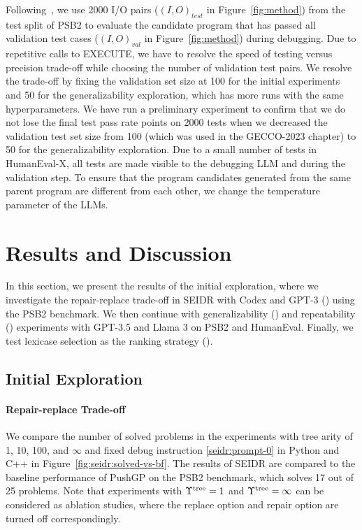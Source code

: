 Following~\cite{psb2}, we use 2000 I/O pairs ($\left(I, O\right)_{test}$ in Figure~\ref{fig:method}) from the test split of PSB2 to evaluate the candidate program that has passed all validation test cases ($\left(I, O\right)_{val}$ in Figure~\ref{fig:method}) during debugging. 
Due to repetitive calls to EXECUTE, we have to resolve the speed of testing versus precision trade-off while choosing the number of validation test pairs.
We resolve the trade-off by fixing the validation set size at 100 for the initial experiments and 50 for the generalizability exploration, which has more runs with the same hyperparameters. 
We have run a preliminary experiment to confirm that we do not lose the final test pass rate points on 2000 tests when we decreased the validation test set size from 100 (which was used in the GECCO-2023  chapter) to 50 for the generalizability exploration.
Due to a small number of tests in HumanEval-X, all tests are made visible to the debugging LLM and during the validation step.  
To ensure that the program candidates generated from the same parent program are different from each other, we change the temperature parameter of the LLMs. 
 

\newpage\section{Results and Discussion}
\label{sec:seidr-results}

In this section, we present the results of the initial exploration, where we investigate the repair-replace trade-off in SEIDR with Codex and GPT-3 (\rqtreearity{}) using the PSB2 benchmark.
We then continue with generalizability (\rqllama{}) and repeatability (\rqmultirun{}) experiments with GPT-3.5 and Llama 3 on PSB2 and HumanEval.
Finally, we test lexicase selection as the ranking strategy (\rqlexicase{}).

\subsection{Initial Exploration}

\paragraph{Repair-replace Trade-off}
\label{sec:seidr-seidr:rqtreearity}
We compare the number of solved problems in the experiments with tree arity of 1, 10, 100, and $\infty$ and fixed debug instruction \ref{seidr:prompt-0} in Python and C++ in Figure~\ref{fig:seidr:solved-vs-bf}. 
The results of SEIDR are compared to the baseline performance of PushGP on the PSB2 benchmark, which solves 17 out of 25 problems. 
Note that experiments with $\Upsilon^\text{tree}=1$ and $\Upsilon^\text{tree}=\infty$ can be considered as ablation studies, where the replace option and repair option are turned off correspondingly. 

